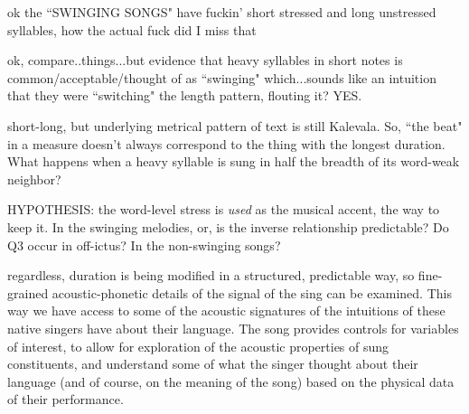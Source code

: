 

ok the ``SWINGING SONGS" have fuckin' short stressed and long unstressed syllables, how the actual fuck did I miss that

ok, compare..things...but evidence that heavy syllables in short notes is common/acceptable/thought of as ``swinging" which...sounds like an intuition that they were ``switching" the length pattern, flouting it? YES. 

short-long, but underlying metrical pattern of text is still Kalevala. 
So, ``the beat" in a measure doesn't always correspond to the thing with the longest duration. What happens when a heavy syllable is sung in half the breadth of its word-weak neighbor? 

HYPOTHESIS: the word-level stress is {\it used} as the musical accent, the way to keep it. In the swinging melodies,
or, is the inverse relationship predictable? Do Q3 occur in off-ictus? In the non-swinging songs? 

regardless, duration is being modified in a structured, predictable way, so fine-grained acoustic-phonetic details of the signal of the sing can be examined. This way we have access to some of the acoustic signatures of the intuitions of these native singers have about their language. The song provides controls for variables of interest, to allow for exploration of the acoustic properties of sung constituents, and understand some of what the singer thought about their language (and of course, on the meaning of the song) based on the physical data of their performance. 